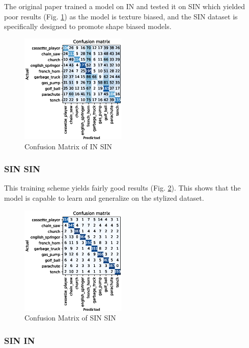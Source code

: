 \documentclass{article}
\begin{document}
The original paper trained a model on IN and tested it on SIN which yielded poor results (Fig. \ref{cm_in-sin}) as 
the model is texture biased, and the SIN dataset is specifically designed to promote shape biased models.

\begin{figure}[h!]
  \includegraphics[width = 0.45\textwidth]{imgs/in/in-sin/in-sin_confusion_matrix_0.313.eps}
  \caption{Confusion Matrix of IN \texorpdfstring{\textrightarrow} .SIN}
  \label{cm_in-sin}
\end{figure}

\subsubsection{SIN \texorpdfstring{\textrightarrow} .SIN}
This training scheme yields fairly good results (Fig. \ref{cm_sin-sin}). This shows that the model is capable to learn
and generalize on the stylized dataset.

\begin{figure}[h!]
  \includegraphics[width = 0.45\textwidth]{imgs/sin/sin-sin/sin-sin_confusion_matrix_0.908.eps}
  \caption{Confusion Matrix of SIN \texorpdfstring{\textrightarrow} .SIN}
  \label{cm_sin-sin}
\end{figure}

\subsubsection{SIN \texorpdfstring{\textrightarrow} .IN}
\end{document}
